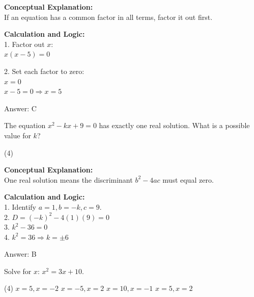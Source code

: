 \documentclass[11pt,paper=a4,answers]{exam}
\begin{document}
\begin{questions}
\begin{solution}
\textbf{Conceptual Explanation:} \\
If an equation has a common factor in all terms, factor it out first.

\vspace{15pt}

\textbf{Calculation and Logic:} \\
1. Factor out $x$: \\
   $x(x - 5) = 0$

\vspace{10pt}

2. Set each factor to zero: \\
   $x = 0$ \\
   $x - 5 = 0 \Rightarrow x = 5$

\vspace{20pt}

Answer: \colorbox{yellow!100}{C}
\end{solution}

\vspace{30pt}

\question
The equation $x^2 - kx + 9 = 0$ has exactly one real solution. What is a possible value for $k$?
\begin{tasks}(4)
\end{tasks}

\begin{solution}
\textbf{Conceptual Explanation:} \\
One real solution means the discriminant $b^2 - 4ac$ must equal zero.

\vspace{15pt}

\textbf{Calculation and Logic:} \\
1. Identify $a = 1, b = -k, c = 9$. \\
2. $D = (-k)^2 - 4(1)(9) = 0$ \\
3. $k^2 - 36 = 0$ \\
4. $k^2 = 36 \Rightarrow k = \pm 6$

\vspace{20pt}

Answer: \colorbox{yellow!100}{B}
\end{solution}

\vspace{30pt}

\question
Solve for $x$: $x^2 = 3x + 10$.
\begin{tasks}(4)
    \task $x = 5, x = -2$
    \task $x = -5, x = 2$
    \task $x = 10, x = -1$
    \task $x = 5, x = 2$
\end{tasks}


\end{questions}
\end{document}
